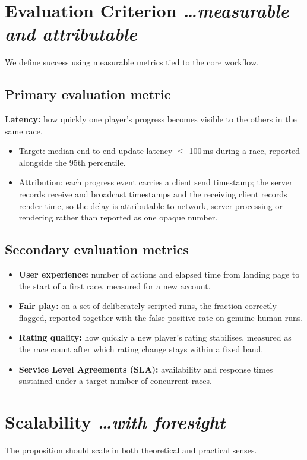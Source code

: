 \documentclass[11pt,a4paper]{article}
\newcommand{\BvrHint}[1]{%
  {\normalfont\normalsize\itshape\hfill #1}}
\begin{document}
\section{Evaluation Criterion %
\BvrHint{\ldots measurable and attributable}}
We define success using measurable metrics tied to the core workflow.

\subsection{Primary evaluation metric}
\textbf{Latency:} how quickly one player's progress becomes
visible to the others in the same race.
\begin{itemize}[leftmargin=0.7cm]
    \item Target: median end-to-end update latency $\le$ 100\,ms during a race, reported alongside the 95th percentile.
    \item Attribution: each progress event carries a client send timestamp; the server records receive and broadcast timestamps and the receiving client records render time, so the delay is attributable to network, server processing or rendering rather than reported as one opaque number.
\end{itemize}

\subsection{Secondary evaluation metrics}
\begin{itemize}[leftmargin=0.7cm]
    \item \textbf{User experience:} number of actions and elapsed time from landing page to the start of a first race, measured for a new account.
    \item \textbf{Fair play:} on a set of deliberately scripted runs, the fraction correctly flagged, reported together with the false-positive rate on genuine human runs.
    \item \textbf{Rating quality:} how quickly a new player's rating stabilises, measured as the race count after which rating change stays within a fixed band.
    \item \textbf{Service Level Agreements (SLA):} availability and response times sustained under a target number of concurrent races.
\end{itemize}

\section{Scalability %
\BvrHint{\ldots with foresight}}
The proposition should scale in both theoretical and practical senses.
\end{document}
